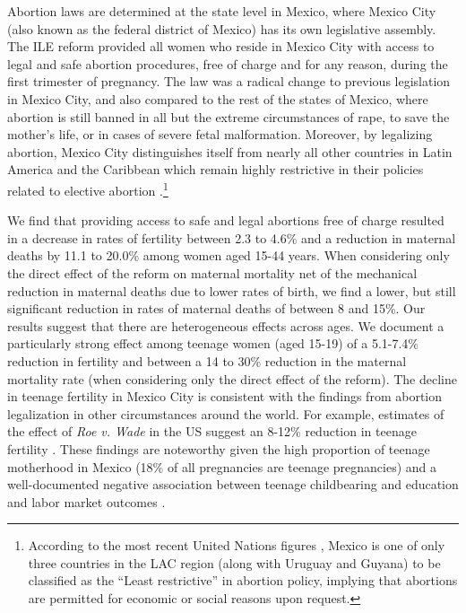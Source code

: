 \documentclass[a4paper, 11pt]{article}
\begin{document}
\begin{spacing}{2}
Abortion laws are determined at the state level in Mexico, where Mexico City (also known as the federal district of Mexico) has its own legislative assembly.  The ILE reform provided all women who reside in Mexico City with access to legal and safe abortion procedures, free of charge and for any reason, during the first trimester of pregnancy. The law was a radical change to previous legislation in Mexico City, and also compared to the rest of the states of Mexico, where abortion is still banned in all but the extreme circumstances of rape, to save the mother's life, or in cases of severe fetal malformation. Moreover, by legalizing abortion, Mexico City distinguishes itself from nearly all other countries in Latin America and the Caribbean which remain highly restrictive in their policies related to elective abortion \citep{Fraser2015}.\footnote{According to the most recent United Nations figures \citep{UN2014}, Mexico is one of only three countries in the LAC region (along with Uruguay and Guyana) to be classified as the ``Least restrictive'' in abortion policy, implying that abortions are permitted for economic or social reasons upon request.}

We find that providing access to safe and legal abortions free of charge resulted in a decrease in rates of fertility between 2.3 to 4.6\% and a reduction in maternal deaths by 11.1 to 20.0\% among women aged 15-44 years.  When considering only the direct effect of the reform on maternal mortality net of the mechanical reduction in maternal deaths due to lower rates of birth, we find a lower, but still significant reduction in rates of maternal deaths of between 8 and 15\%.  Our results suggest that there are heterogeneous effects across ages. We document a particularly strong effect among teenage women (aged 15-19) of a 5.1-7.4\% reduction in fertility and between a 14 to 30\% reduction in the maternal mortality rate (when considering only the direct effect of the reform). The decline in teenage fertility in Mexico City is consistent with the findings from abortion legalization in other circumstances around the world.  For example, estimates of the effect of \textit{Roe v. Wade} in the US suggest an 8-12\% reduction in teenage fertility \citep{AngristEvans}. These findings are noteworthy given the high proportion of teenage motherhood in Mexico (18\% of all pregnancies are teenage pregnancies) and a well-documented negative association between teenage childbearing and education and labor market outcomes \citep{furstenberg1976unplanned}. 


\end{spacing}
\end{document}
